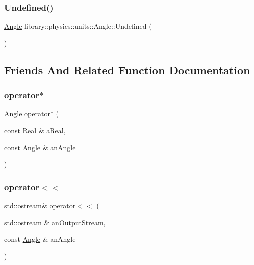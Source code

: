 \subsubsection{\texorpdfstring{Undefined()}{Undefined()}}
{\footnotesize\ttfamily \hyperlink{classlibrary_1_1physics_1_1units_1_1_angle}{Angle} library\+::physics\+::units\+::\+Angle\+::\+Undefined (\begin{DoxyParamCaption}{ }\end{DoxyParamCaption})\hspace{0.3cm}{\ttfamily [static]}}



\subsection{Friends And Related Function Documentation}
\mbox{\label{classlibrary_1_1physics_1_1units_1_1_angle_af699984b24759466957ecddaa7e61fc9}} 
\subsubsection{\texorpdfstring{operator$\ast$}{operator*}}
{\footnotesize\ttfamily \hyperlink{classlibrary_1_1physics_1_1units_1_1_angle}{Angle} operator$\ast$ (\begin{DoxyParamCaption}\item[{const Real \&}]{a\+Real,  }\item[{const \hyperlink{classlibrary_1_1physics_1_1units_1_1_angle}{Angle} \&}]{an\+Angle }\end{DoxyParamCaption})\hspace{0.3cm}{\ttfamily [friend]}}

\mbox{\label{classlibrary_1_1physics_1_1units_1_1_angle_a0846b77ee3281e8a559197c3c3208eed}} 
\subsubsection{\texorpdfstring{operator$<$$<$}{operator<<}}
{\footnotesize\ttfamily std\+::ostream\& operator$<$$<$ (\begin{DoxyParamCaption}\item[{std\+::ostream \&}]{an\+Output\+Stream,  }\item[{const \hyperlink{classlibrary_1_1physics_1_1units_1_1_angle}{Angle} \&}]{an\+Angle }\end{DoxyParamCaption})\hspace{0.3cm}{\ttfamily [friend]}}




